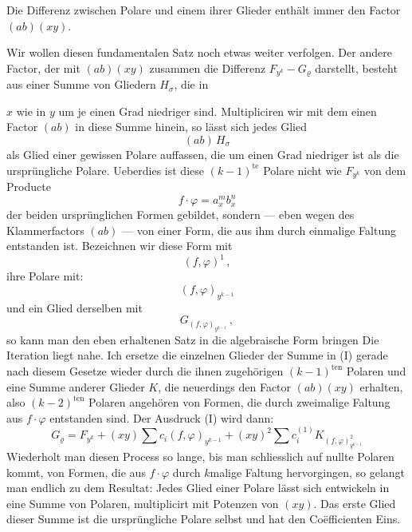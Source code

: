 \glqq Die Differenz zwischen Polare und einem ihrer Glieder enthält immer den Factor $(ab)(xy)$.\grqq{}

Wir wollen diesen fundamentalen Satz noch etwas weiter verfolgen. Der andere Factor, der mit $(ab)(xy)$ zusammen die Differenz $F_{y^k}-G_\varrho$ darstellt, besteht aus einer Summe von Gliedern $H_\sigma$, die in


$x$ wie in $y$ um je einen Grad niedriger sind. Multipliciren wir mit dem einen Factor $(ab)$ in diese Summe hinein, so lässt sich jedes Glied
\[
(ab)\,H_\sigma
\]
als Glied einer gewissen Polare auffassen, die um einen Grad niedriger ist als die ursprüngliche Polare. Ueberdies ist diese $(k-1)^{\text{te}}$ Polare nicht wie $F_{y^k}$ von dem Producte
\[
f\cdot\varphi=a_x^m b_x^n
\]
der beiden ursprünglichen Formen gebildet, sondern — eben wegen des Klammerfactors $(ab)$ — von einer Form, die aus ihm durch einmalige Faltung entstanden ist. Bezeichnen wir diese Form mit
\[
(f,\varphi)^1\,,
\]
ihre Polare mit:
\[
(f,\varphi)_{y^{k-1}}
\]
und ein Glied derselben mit
\[
G_{(f,\varphi)_{y^{k-1}}}\,,
\]
so kann man den eben erhaltenen Satz in die algebraische Form bringen
Die Iteration liegt nahe. Ich ersetze die einzelnen Glieder der Summe in (I) gerade nach diesem Gesetze wieder durch die ihnen zugehörigen $(k-1)^{\text{ten}}$ Polaren und eine Summe anderer Glieder $K$, die neuerdings den Factor $(ab)(xy)$ erhalten, also $(k-2)^{\text{ten}}$ Polaren angehören von Formen, die durch zweimalige Faltung aus $f\cdot\varphi$ entstanden sind. Der Ausdruck (I) wird dann:
\[
G_\varrho=F_{y^k}+(xy)\sum c_i(f,\varphi)_{y^{k-1}}+(xy)^2\sum c_i^{(1)}K_{(f,\varphi)^2_{y^{k-1}}}
\]
Wiederholt man diesen Process so lange, bis man schliesslich auf nullte Polaren kommt, von Formen, die aus $f\cdot\varphi$ durch $k$malige Faltung hervorgingen, so gelangt man endlich zu dem Resultat:
\glqq Jedes Glied einer Polare lässt sich entwickeln in eine Summe von Polaren, multiplicirt mit Potenzen von $(xy)$. Das erste Glied dieser Summe ist die ursprüngliche Polare selbst und hat den Co\"efficienten Eins.\grqq{}

